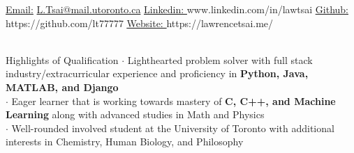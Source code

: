 \documentclass[UTF8]{resume} %
\begin{document}
  \scriptsize\underline{Email:}
            \href{L.Tsai@mail.utoronto.ca}{L.Tsai@mail.utoronto.ca}     {  }
            \href{https://www.linkedin.com/in/lawtsai}{\scriptsize\underline{Linkedin: }}{www.linkedin.com/in/lawtsai}
            {        }
           \href{https://github.com/lt77777}{\scriptsize\underline{Github: }}{https://github.com/lt77777}
           {        }
           \href{https://lawrencetsai.me/}{\scriptsize\underline{Website: }}{https://lawrencetsai.me/}\\
~\vspace{-0.6cm}


\begin{rSection}{Highlights of Qualification}
    \scriptsize{
    $\cdot$ Lighthearted problem solver with full stack industry/extracurricular experience and proficiency in \textbf{Python, Java, MATLAB, and Django}\\
    $\cdot$ Eager learner that is working towards mastery of \textbf{C, C++, and Machine Learning} along with advanced studies in Math and Physics\\
    $\cdot$ Well-rounded involved student at the University of Toronto with additional interests in Chemistry, Human Biology, and Philosophy 
    }
\end{rSection}
\end{document}
